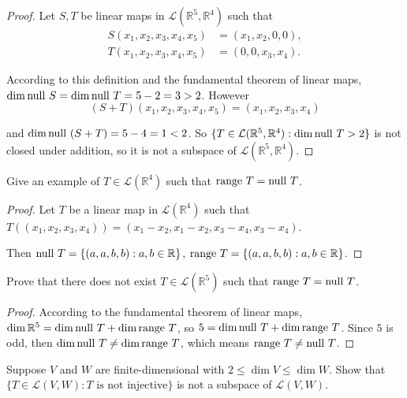 \begin{proof}
    Let $S, T$ be linear maps in $\mathcal{L}(\mathbb{R}^{5}, \mathbb{R}^{4})$ such that
    \begin{align*}
        S(x_{1}, x_{2}, x_{3}, x_{4}, x_{5}) & = (x_{1}, x_{2}, 0, 0), \\
        T(x_{1}, x_{2}, x_{3}, x_{4}, x_{5}) & = (0, 0, x_{3}, x_{4}).
    \end{align*}

    According to this definition and the fundamental theorem of linear maps, $\dim \operatorname{null}\,{S} = \dim \operatorname{null}\,{T} = 5 - 2 = 3 > 2$. However
    \[
        (S + T)(x_{1}, x_{2}, x_{3}, x_{4}, x_{5}) = (x_{1}, x_{2}, x_{3}, x_{4})
    \]

    and $\dim\operatorname{null}\,{(S+T)} = 5 - 4 = 1 < 2$. So $\{T \in \mathcal{L}(\mathbb{R}^{5}, \mathbb{R}^{4} ): \dim \operatorname{null}\,{T} > 2\}$ is not closed under addition, so it is not a subspace of $\mathcal{L}(\mathbb{R}^{5}, \mathbb{R}^{4})$.
\end{proof}
\newpage

\begin{exercise}
    Give an example of $T \in \mathcal{L}(\mathbb{R}^{4})$ such that $\operatorname{range}\,{T} = \operatorname{null}\,{T}$.
\end{exercise}

\begin{proof}
    Let $T$ be a linear map in $\mathcal{L}(\mathbb{R}^{4})$ such that $T((x_{1}, x_{2}, x_{3}, x_{4})) = (x_{1} - x_{2}, x_{1} - x_{2}, x_{3} - x_{4}, x_{3} - x_{4})$.

    Then $\operatorname{null}\,{T} = \{ (a, a, b, b): a, b\in \mathbb{R} \}$, $\operatorname{range}\,{T} = \{ (a, a, b, b): a, b\in \mathbb{R} \}$.
\end{proof}
\newpage

\begin{exercise}
    Prove that there does not exist $T \in \mathcal{L}(\mathbb{R}^{5})$ such that $\operatorname{range}\,{T} = \operatorname{null}\,{T}$.
\end{exercise}

\begin{proof}
    According to the fundamental theorem of linear maps, $\dim \mathbb{R}^{5} = \dim\operatorname{null}\,{T} + \dim\operatorname{range}\,{T}$, so $5 = \dim\operatorname{null}\,{T} + \dim\operatorname{range}\,{T}$. Since $5$ is odd, then $\dim\operatorname{null}\,{T}\ne \dim\operatorname{range}\,{T}$, which means $\operatorname{range}\,{T}\ne \operatorname{null}\,{T}$.
\end{proof}
\newpage

\begin{exercise}
    Suppose $V$ and $W$ are finite-dimensional with $2 \leq \dim V \leq \dim W$. Show that $\{T \in \mathcal{L}(V, W) : T \text{ is not injective} \}$ is not a subspace of $\mathcal{L}(V, W)$.
\end{exercise}

